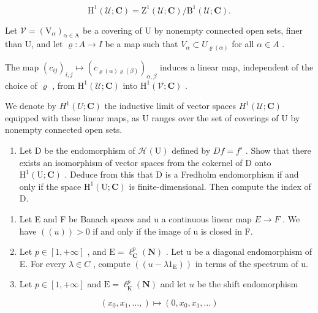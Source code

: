 \[
\mathrm{H} ^ {1} (\mathcal {U}; \mathbf {C}) = \mathrm{Z} ^ {1} (\mathcal {U}; \mathbf {C}) / \mathrm{B} ^ {1} (\mathcal {U}; \mathbf {C}).
\]

Let \(\mathcal{V}=(\mathrm{V}_{\alpha})_{\alpha\in\mathrm{A}}\) be a covering of U by nonempty connected open sets, finer than U, and let \(\varrho\colon A\to I\) be a map such that \(V_{\alpha}\subset U_{\varrho(\alpha)}\) for all \(\alpha\in A\) .

The map \((c_{ij})_{i,j} \mapsto (c_{\varrho(\alpha)\varrho(\beta)})_{\alpha,\beta}\) induces a linear map, independent of the choice of \(\varrho\) , from \(\mathrm{H}^1(\mathcal{U};\mathbf{C})\) into \(\mathrm{H}^1(\mathcal{V};\mathbf{C})\) .

We denote by \(H^{1}(U; \mathbf{C})\) the inductive limit of vector spaces \(H^{1}(\mathcal{U}; \mathbf{C})\) equipped with these linear maps, as U ranges over the set of coverings of U by nonempty connected open sets.

\begin{enumerate}
\def\labelenumi{\alph{enumi})}
\setcounter{enumi}{2}
\tightlist
\item
  Let D be the endomorphism of \(\mathcal{H}(\mathrm{U})\) defined by \(Df = f'\) . Show that there exists an isomorphism of vector spaces from the cokernel of D onto \(\mathrm{H}^1 (\mathrm{U};\mathbf{C})\) . Deduce from this that D is a Fredholm endomorphism if and only if the space \(\mathrm{H}^1 (\mathrm{U};\mathbf{C})\) is finite-dimensional. Then compute the index of D.
\end{enumerate}

\exercisesection{}

\begin{enumerate}
\def\labelenumi{\arabic{enumi})}
\item
  Let E and F be Banach spaces and u a continuous linear map \(E \rightarrow F\) . We have \(((u)) > 0\) if and only if the image of u is closed in F.
\item
  Let \(p \in [1, +\infty]\) , and \(\mathrm{E} = \ell_{\mathbf{C}}^{p}(\mathbf{N})\) . Let u be a diagonal endomorphism of E. For every \(\lambda \in C\) , compute \(((u - \lambda 1_{\mathrm{E}}))\) in terms of the spectrum of u.
\item
  Let \(p \in [1, +\infty]\) and \(\mathrm{E} = \ell_{\mathrm{K}}^{p}(\mathbf{N})\) and let \(u\) be the shift endomorphism
\end{enumerate}

\[
(x _ {0}, x _ {1}, \dots ,) \mapsto (0, x _ {0}, x _ {1}, \dots)
\]

